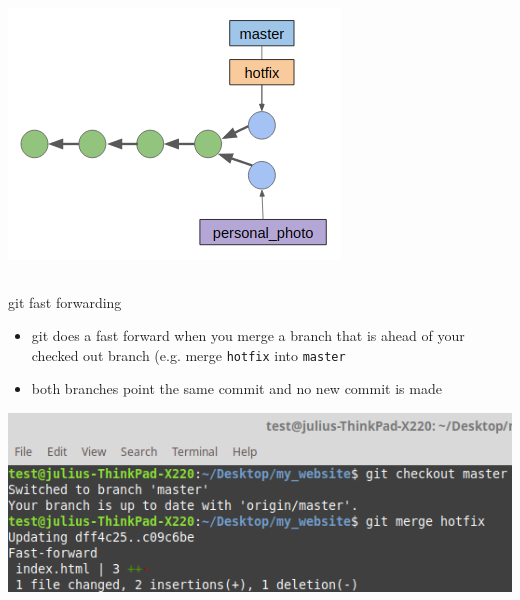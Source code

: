\documentclass[12pt]{beamer}
\begin{document}
\begin{frame}
\begin{columns}
	\begin{column}{0.33\linewidth}
		\includegraphics[width=\linewidth]{branch_3}
	\end{column}
\end{columns}
\end{frame}

\begin{frame}{git fast forwarding}
\begin{itemize}
	\item git does a fast forward when you merge a branch that is ahead of your checked out branch (e.g. merge \texttt{hotfix} into \texttt{master}
	\item both branches point the same commit and no new commit is made	
\end{itemize}
\begin{center}
	\includegraphics[width=\linewidth]{fast_forward}
\end{center}
\end{frame}
\end{document}
